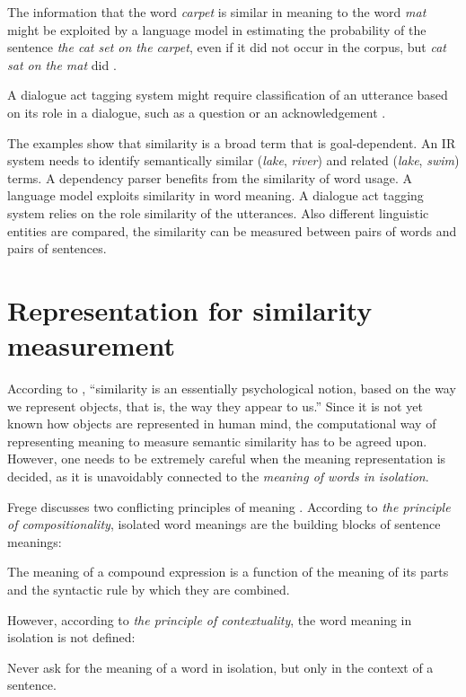 The information that the word \textit{carpet} is similar in meaning to the word \textit{mat} might be exploited by a language model in estimating the probability of the sentence \textit{the cat set on the carpet}, even if it did not occur in the corpus, but \textit{cat sat on the mat} did \cite{bengio2006}.

A dialogue act tagging system might require classification of an utterance based on its role in a dialogue, such as a question or an acknowledgement \cite{kalchbrenner-blunsom:2013:CVSC}.

The examples show that similarity is a broad term that is goal-dependent. An IR system needs to identify semantically similar (\textit{lake}, \textit{river}) and related (\textit{lake}, \textit{swim}) terms. A dependency parser benefits from the similarity of word usage. A language model exploits similarity in word meaning. A dialogue act tagging system relies on the role similarity of the utterances. Also different linguistic entities are compared, the similarity can be measured between pairs of words and pairs of sentences.

\section{Representation for similarity measurement}
\label{sec:word-meaning}

According to , ``similarity is an essentially psychological notion, based on the way we represent objects, that is, the way they appear to us.'' Since it is not yet known how objects are represented in human mind, the computational way of representing meaning to measure semantic similarity has to be agreed upon. However, one needs to be extremely careful when the meaning representation is decided, as it is unavoidably connected to the \emph{meaning of words in isolation}.


Frege discusses two conflicting principles of meaning \cite{Janssen2001}. According to \emph{the principle of compositionality}, isolated word meanings are the building blocks of sentence meanings:
\begin{displayquote}
The meaning of a compound expression is a function of the meaning of its parts and the syntactic rule by which they are combined.
\end{displayquote}
%
However, according to \emph{the principle of contextuality}, the word meaning in isolation is not defined:
\begin{displayquote}
Never ask for the meaning of a word in isolation, but only in the context of a sentence.
\end{displayquote}

